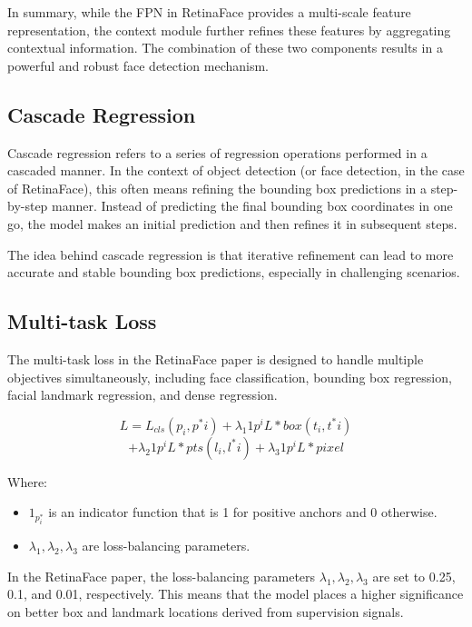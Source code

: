 \documentclass{article}
\begin{document}
In summary, while the FPN in RetinaFace provides a multi-scale feature representation, the context module further refines these features by aggregating contextual information. The combination of these two components results in a powerful and robust face detection mechanism.


\subsection{Cascade Regression}

Cascade regression refers to a series of regression operations performed in a cascaded manner. In the context of object detection (or face detection, in the case of RetinaFace), this often means refining the bounding box predictions in a step-by-step manner. Instead of predicting the final bounding box coordinates in one go, the model makes an initial prediction and then refines it in subsequent steps.

The idea behind cascade regression is that iterative refinement can lead to more accurate and stable bounding box predictions, especially in challenging scenarios.

\subsection{Multi-task Loss}

The multi-task loss in the RetinaFace paper is designed to handle multiple objectives simultaneously, including face classification, bounding box regression, facial landmark regression, and dense regression.

\[ L = L_{cls}(p_i, p^*i) + \lambda_1 1{p^i} L*{box}(t_i, t^*i) \]
\[+ \lambda_2 1{p^i} L*{pts}(l_i, l^*i) + \lambda_3 1{p^i} L*{pixel} \]

Where:

\begin{itemize}
\item \( 1_{p^*_i} \) is an indicator function that is 1 for positive anchors and 0 otherwise.
\item \( \lambda_1, \lambda_2, \lambda_3 \) are loss-balancing parameters.
\end{itemize}

In the RetinaFace paper, the loss-balancing parameters \( \lambda_1, \lambda_2, \lambda_3 \) are set to 0.25, 0.1, and 0.01, respectively. This means that the model places a higher significance on better box and landmark locations derived from supervision signals.
\end{document}
